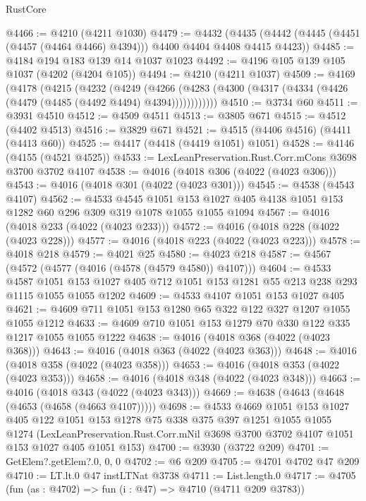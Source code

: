 \begin{lexlean}{RustCore}
\begin{coremodule}
@4466 := @4210 (@4211 @1030)
@4479 := @4432
    (@4435 (@4442 (@4445 (@4451 (@4457 (@4464 @4466) @4394))) @4400 @4404 @4408 @4415 @4423))
@4485 := @4184 @194 @183 @139 @14 @1037 @1023
@4492 := @4196 @105 @139 @105 @1037 (@4202 (@4204 @105))
@4494 := @4210 (@4211 @1037)
@4509 := @4169
    (@4178
      (@4215
        (@4232
          (@4249
            (@4266 (@4283 (@4300 (@4317 (@4334 (@4426 (@4479 (@4485 (@4492 @4494) @4394))))))))))))
@4510 := @3734 @60
@4511 := @3931 @4510
@4512 := @4509 @4511
@4513 := @3805 @671
@4515 := @4512 (@4402 @4513)
@4516 := @3829 @671
@4521 := @4515 (@4406 @4516) (@4411 (@4413 @60))
@4525 := @4417 (@4418 (@4419 @1051) @1051)
@4528 := @4146 (@4155 (@4521 @4525))
@4533 := LexLeanPreservation.Rust.Corr.mCons @3698 @3700 @3702 @4107
@4538 := @4016 (@4018 @306 (@4022 (@4023 @306)))
@4543 := @4016 (@4018 @301 (@4022 (@4023 @301)))
@4545 := @4538 (@4543 @4107)
@4562 := @4533
    @4545
    @1051
    @153
    @1027
    @405
    @4138
    @1051
    @153
    @1282
    @60
    @296
    @309
    @319
    @1078
    @1055
    @1055
    @1094
@4567 := @4016 (@4018 @233 (@4022 (@4023 @233)))
@4572 := @4016 (@4018 @228 (@4022 (@4023 @228)))
@4577 := @4016 (@4018 @223 (@4022 (@4023 @223)))
@4578 := @4018 @218
@4579 := @4021 @25
@4580 := @4023 @218
@4587 := @4567 (@4572 (@4577 (@4016 (@4578 (@4579 @4580)) @4107)))
@4604 := @4533
    @4587
    @1051
    @153
    @1027
    @405
    @712
    @1051
    @153
    @1281
    @55
    @213
    @238
    @293
    @1115
    @1055
    @1055
    @1202
@4609 := @4533 @4107 @1051 @153 @1027 @405
@4621 := @4609 @711 @1051 @153 @1280 @65 @322 @122 @327 @1207 @1055 @1055 @1212
@4633 := @4609 @710 @1051 @153 @1279 @70 @330 @122 @335 @1217 @1055 @1055 @1222
@4638 := @4016 (@4018 @368 (@4022 (@4023 @368)))
@4643 := @4016 (@4018 @363 (@4022 (@4023 @363)))
@4648 := @4016 (@4018 @358 (@4022 (@4023 @358)))
@4653 := @4016 (@4018 @353 (@4022 (@4023 @353)))
@4658 := @4016 (@4018 @348 (@4022 (@4023 @348)))
@4663 := @4016 (@4018 @343 (@4022 (@4023 @343)))
@4669 := @4638 (@4643 (@4648 (@4653 (@4658 (@4663 @4107)))))
@4698 := @4533
    @4669
    @1051
    @153
    @1027
    @405
    @122
    @1051
    @153
    @1278
    @75
    @338
    @375
    @397
    @1251
    @1055
    @1055
    @1274
    (LexLeanPreservation.Rust.Corr.mNil @3698 @3700 @3702 @4107 @1051 @153 @1027 @405 @1051 @153)
@4700 := @3930 (@3722 @209)
@4701 := GetElem?.getElem?.{0, 0, 0}
@4702 := @6 @209
@4705 := @4701 @4702 @47 @209
@4710 := LT.lt.{0} @47 instLTNat @3738
@4711 := List.length.{0}
@4717 := @4705 (fun (as : @4702) => fun (i : @47) => @4710 (@4711 @209 @3783))

\end{coremodule}
\end{lexlean}
